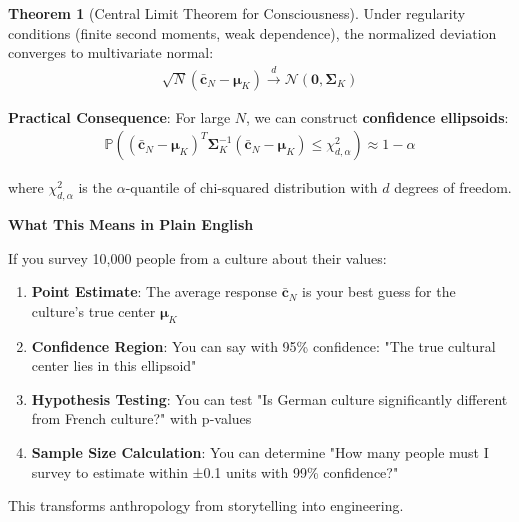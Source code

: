 \documentclass[11pt,a4paper]{article}
\theoremstyle{definition}
\newtheorem{theorem}{Theorem}[section]
\theoremstyle{remark}
\newcommand{\cc}{\mathbf{c}}
\begin{document}
\begin{theorem}[Central Limit Theorem for Consciousness]
Under regularity conditions (finite second moments, weak dependence), the normalized deviation converges to multivariate normal:
\begin{align}
\sqrt{N}(\bar{\cc}_N - \boldsymbol{\mu}_K) \xrightarrow{d} \mathcal{N}(\mathbf{0}, \boldsymbol{\Sigma}_K)
\end{align}

\textbf{Practical Consequence}: For large \(N\), we can construct \textbf{confidence ellipsoids}:
\begin{align}
\mathbb{P}\left((\bar{\cc}_N - \boldsymbol{\mu}_K)^T \boldsymbol{\Sigma}_K^{-1} (\bar{\cc}_N - \boldsymbol{\mu}_K) \leq \chi^2_{d,\alpha}\right) \approx 1 - \alpha
\end{align}

where \(\chi^2_{d,\alpha}\) is the \(\alpha\)-quantile of chi-squared distribution with \(d\) degrees of freedom.
\end{theorem}

\begin{mdframed}[backgroundcolor=cyan!10,linewidth=2pt]
\textbf{What This Means in Plain English}

If you survey 10,000 people from a culture about their values:

\begin{enumerate}
    \item \textbf{Point Estimate}: The average response \(\bar{\cc}_N\) is your best guess for the culture's true center \(\boldsymbol{\mu}_K\)
    
    \item \textbf{Confidence Region}: You can say with 95\% confidence: "The true cultural center lies in this ellipsoid"
    
    \item \textbf{Hypothesis Testing}: You can test "Is German culture significantly different from French culture?" with p-values
    
    \item \textbf{Sample Size Calculation}: You can determine "How many people must I survey to estimate within ±0.1 units with 99\% confidence?"
\end{enumerate}

This transforms anthropology from storytelling into engineering.
\end{mdframed}
\end{document}
